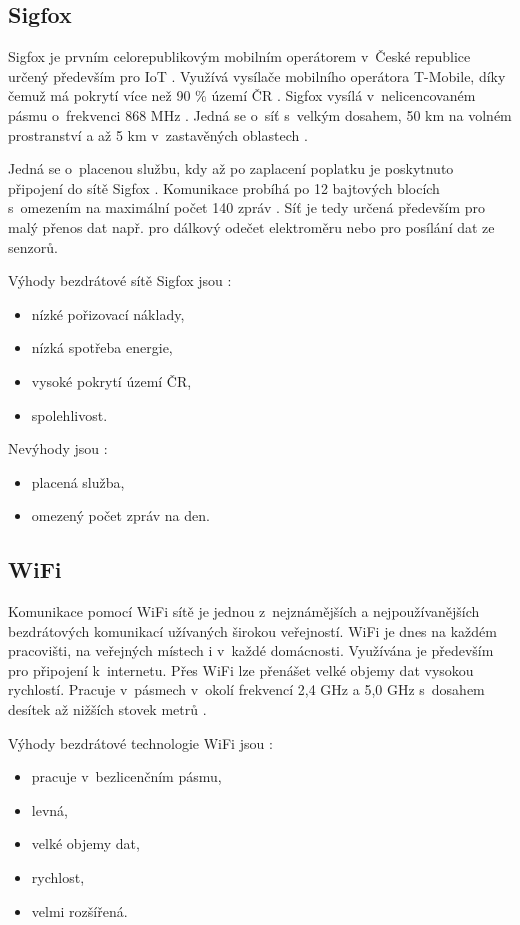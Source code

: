 \subsection{Sigfox}
Sigfox je prvním celorepublikovým mobilním operátorem v~České republice určený především pro IoT \cite{Sigfox_cz}. Využívá vysílače mobilního operátora T-Mobile, 
díky čemuž má pokrytí více než 90 \% území ČR \cite{Sigfox_Zooco}. Sigfox vysílá v~nelicencovaném pásmu o~frekvenci 868 MHz \cite{Sigfox_cz}. Jedná se o~síť 
s~velkým dosahem, 50 km na volném prostranství a až 5 km v~zastavěných oblastech \cite{Sigfox_Zooco}.  

Jedná se o~placenou službu, kdy až po zaplacení poplatku je poskytnuto připojení do sítě Sigfox \cite{Sigfox_Zooco}. Komunikace probíhá po 12 bajtových 
blocích s~omezením na maximální počet 140 zpráv \cite{Sigfox_Zooco}. Síť je tedy určená především pro malý přenos dat např. pro dálkový odečet elektroměru 
nebo pro posílání dat ze senzorů. 

Výhody bezdrátové sítě Sigfox jsou \cite{Sigfox_cz} \cite{Sigfox_Zooco}:
\begin{itemize}
  \item nízké pořizovací náklady,
  \item nízká spotřeba energie,
  \item vysoké pokrytí území ČR,
  \item spolehlivost.
\end{itemize}

Nevýhody jsou \cite{Sigfox_cz}:
\begin{itemize}
  \item placená služba,
  \item omezený počet zpráv na den.
\end{itemize}

\subsection{WiFi}
Komunikace pomocí WiFi sítě je jednou z~nejznámějších a nejpoužívanějších bezdrátových komunikací užívaných širokou veřejností. 
WiFi je dnes na každém pracovišti, na veřejných místech i v~každé domácnosti. Využívána je především pro připojení k~internetu. 
Přes WiFi lze přenášet velké objemy dat vysokou rychlostí. Pracuje v~pásmech v~okolí frekvencí 2,4 GHz a 5,0 GHz s~dosahem 
desítek až nižších stovek metrů \cite{Bezdrat_muni}. 

Výhody bezdrátové technologie WiFi jsou \cite{Bezdrat_muni}:
\begin{itemize}
  \item pracuje v~bezlicenčním pásmu, 
  \item levná, 
  \item velké objemy dat,
  \item rychlost,
  \item velmi rozšířená.
\end{itemize}

